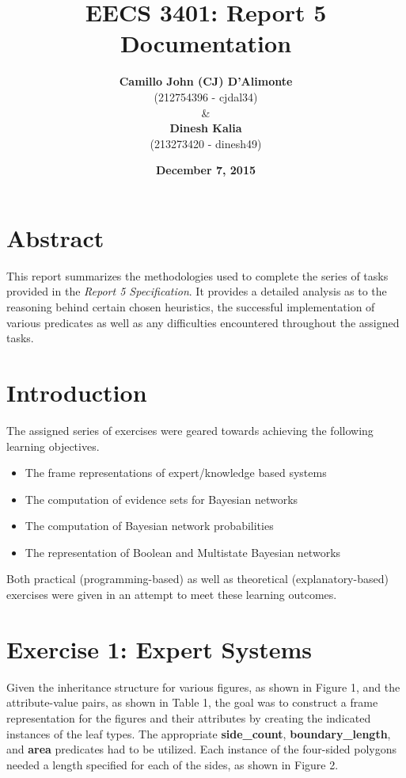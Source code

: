 \documentclass[11pt]{article}
\newcommand{\forceindent}{\leavevmode{\parindent=1em\indent}}
\begin{document}
\title{\textbf{EECS 3401: Report 5 Documentation}}
\author{\textbf{Camillo John (CJ) D'Alimonte}\\ (212754396 - cjdal34) \\
\& \\
\textbf{Dinesh Kalia}\\ (213273420 - dinesh49)}
\date {\textbf{December 7, 2015}}
\maketitle

\tableofcontents
\newpage

\section{Abstract}
\forceindent This report summarizes the methodologies used to complete the series of tasks provided in the \emph{Report 5 Specification}. It provides a detailed analysis as to the reasoning behind certain chosen heuristics, the successful implementation of various predicates as well as any difficulties encountered throughout the assigned tasks.

\section{Introduction}
\forceindent The assigned series of exercises were geared towards achieving the following learning objectives.
\begin{itemize}
\item The frame representations of expert/knowledge based systems
\item The computation of evidence sets for Bayesian networks
\item The computation of Bayesian network probabilities
\item The representation of Boolean and Multistate Bayesian networks
\end{itemize}

Both practical (programming-based) as well as theoretical (explanatory-based) exercises were given in an attempt to meet these learning outcomes.

\section{Exercise 1: Expert Systems}
\forceindent Given the inheritance structure for various figures, as shown in Figure 1, and the attribute-value pairs, as shown in Table 1, the goal was to construct a frame representation for the figures and their attributes by creating the indicated instances of the leaf types. The appropriate \textbf{side\_count}, \textbf{boundary\_length}, and \textbf{area} predicates had to be utilized. Each instance of the four-sided polygons needed a length specified for each of the sides, as shown in Figure 2.
\end{document}
